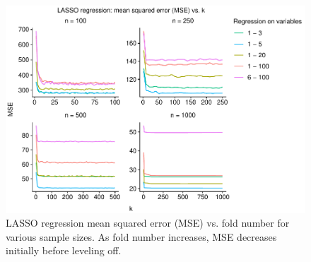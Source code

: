 \documentclass[
  12pt,
]{article}
\begin{document}
\begin{figure}[H]

{\centering \includegraphics{manuscript_files/figure-latex/unnamed-chunk-6-1} 

}

\caption{LASSO regression mean squared error (MSE) vs. fold number for various sample sizes. As fold number increases, MSE decreases initially before leveling off.}\label{fig:unnamed-chunk-6}
\end{figure}
\end{document}
